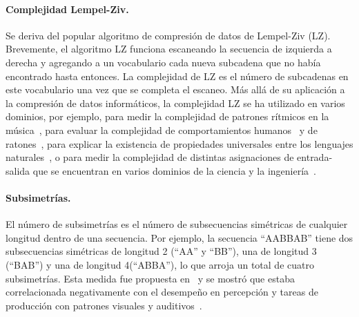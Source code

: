 
\paragraph{Complejidad Lempel-Ziv.} Se deriva del popular algoritmo de compresión de datos de Lempel-Ziv (LZ)\cite{f98}. Brevemente, el algoritmo LZ funciona escaneando la secuencia de izquierda a derecha y agregando a un vocabulario cada nueva subcadena que no había encontrado hasta entonces. La complejidad de LZ es el número de subcadenas en este vocabulario una vez que se completa el escaneo. Más allá de su aplicación a la compresión de datos informáticos, la complejidad LZ se ha utilizado en varios dominios, por ejemplo, para medir la complejidad de patrones rítmicos en la música~\cite{f61}, para evaluar la complejidad de comportamientos humanos~\cite{f99} y de ratones~\cite{f100}, para explicar la existencia de propiedades universales entre los lenguajes naturales~\cite{f101}, o para medir la complejidad de distintas asignaciones de entrada-salida que se encuentran en varios dominios de la ciencia y la ingeniería~\cite{f102,f103}.


\paragraph{Subsimetrías.} El número de subsimetrías es el número de subsecuencias simétricas de cualquier longitud dentro de una secuencia. Por ejemplo, la secuencia ``AABBAB'' tiene dos subsecuencias simétricas de longitud 2 (``AA'' y ``BB''), una de longitud 3 (``BAB'') y una de longitud 4(``ABBA''), lo que arroja un total de cuatro subsimetrías. Esta medida fue propuesta en~\cite{f94} y se mostró que estaba correlacionada negativamente con el desempeño en percepción y tareas de producción con patrones visuales y auditivos~\cite{f94,f104}.

